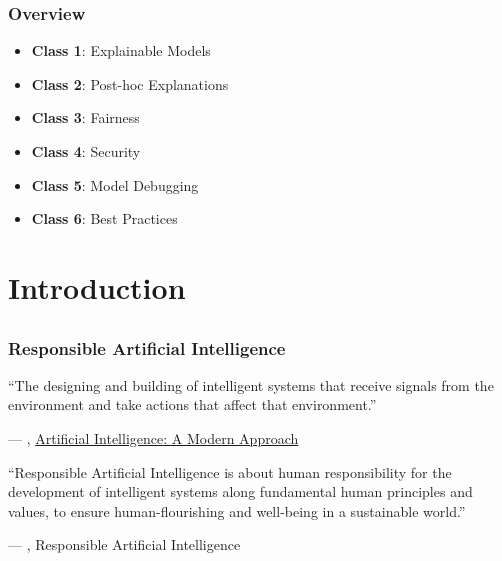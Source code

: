 \documentclass[11pt,aspectratio=169,hyperref={colorlinks}]{beamer}
\begin{document}
	
	\begin{frame}
	
		\frametitle{Overview}
		
		\begin{itemize}
			\item{\textbf{Class 1}: Explainable Models}
			\item{\textbf{Class 2}: Post-hoc Explanations}
			\item{\textbf{Class 3}: Fairness}
			\item{\textbf{Class 4}: Security}
			\item{\textbf{Class 5}: Model Debugging}
			\item{\textbf{Class 6}: Best Practices}
		\end{itemize}
			
					
	\end{frame}

	\section{Introduction}
		\subsection*{} %
	
		\begin{frame}
	
			\frametitle{Responsible Artificial Intelligence}
	
			\epigraph{``The designing and building of intelligent systems that receive signals from the environment and take actions that affect that environment.''}{--- \citet{russell2010artificial}, \href{https://aima.cs.berkeley.edu/}{Artificial Intelligence: A Modern Approach}}

			\epigraph{``Responsible Artificial Intelligence is about human responsibility for the development of intelligent systems along fundamental human principles and values, to ensure human-flourishing and well-being in a sustainable world.''}{--- \citet{dignum2019responsible}, Responsible Artificial Intelligence} 
	
		\end{frame}		
\end{document}
